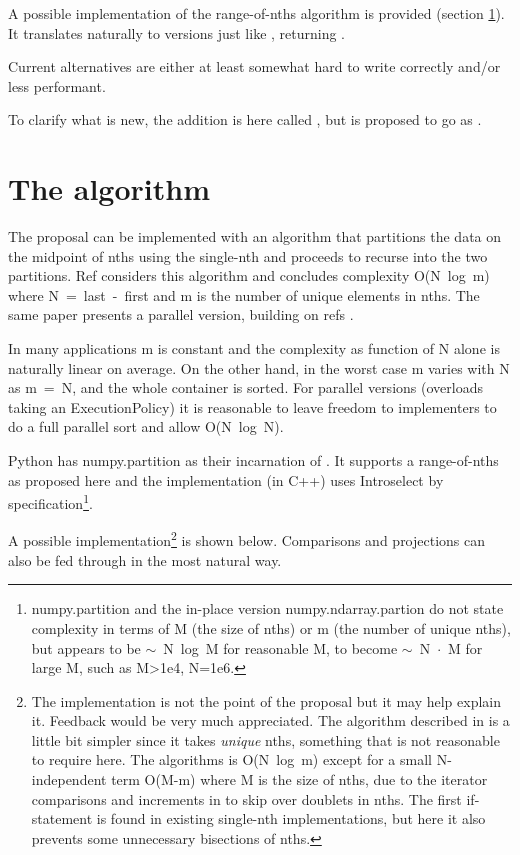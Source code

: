 A possible implementation of the range-of-nths algorithm is provided (section \ref{Implementation}).
It translates naturally to  versions just like , returning .

Current alternatives are either at least somewhat hard to write correctly and/or less performant.

To clarify what is new, the addition is here called , but is proposed to go as . 

\section{The algorithm}
\label{Implementation}
\label{Implement}

The proposal can be implemented with an algorithm that partitions the data on the midpoint of nths using the single-nth  and proceeds to recurse into the two partitions. Ref \cite{Alsuwaiyel2001} considers this algorithm and concludes
 complexity \mbox{O(N log m)} where \mbox{N = last - first} and m is the number of unique elements in nths.
The same paper presents a parallel version, building on refs \cite{Akl1984,Akl1989,Shen1997}.

In many applications m is constant and the complexity as function of N alone is naturally linear on average. On the other hand, in the worst case m varies with N as \mbox{m = N}, and the whole container is sorted. For parallel versions (overloads taking an ExecutionPolicy) it is reasonable to leave freedom to implementers to do a full parallel sort and allow \mbox{O(N log N)}.

Python has numpy.partition\cite{NpPart} as their incarnation of .
It supports a range-of-nths as proposed here and the implementation\cite{NPImpl} (in C++) uses \mbox{Introselect\cite{Musser1997}} by specification\footnote{numpy.partition and the in-place version numpy.ndarray.partion do not state complexity in terms of M (the size of nths) or m (the number of unique nths), but appears to be \mbox{$\sim$ N log M} for reasonable M, to become \mbox{$\sim$ N $\cdot$ M} for large M, such as M>1e4, N=1e6. }.

A possible implementation\footnote{
The implementation is not the point of the proposal but it may help explain it. Feedback would be very much appreciated. 
The algorithm described in \cite{Alsuwaiyel2001} is a little bit simpler since it takes \emph{unique} nths, something that is not reasonable to require here. The algorithms is \mbox{O(N log m)} except for a small N-independent term \mbox{O(M-m)} where M is the size of nths, due to the iterator comparisons and increments in  to skip over doublets in nths. The first if-statement is found in existing single-nth  implementations, but here it also prevents some unnecessary bisections of nths.}\cite{p2375RefImpl}
is shown below. Comparisons and projections can also be fed through in the most natural way. 

